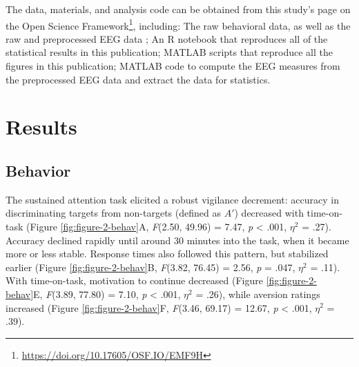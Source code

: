 \documentclass[11pt,english,]{memoir}
\let\rmarkdownfootnote\footnote%
\def\footnote{\protect\rmarkdownfootnote}
\renewcommand{\href}[2]{#2\footnote{\url{#1}}} %
\begin{document}
The data, materials, and analysis code can be obtained from this study's page on the \href{https://doi.org/10.17605/OSF.IO/EMF9H}{Open Science Framework}, including: The raw behavioral data, as well as the raw and preprocessed EEG data \autocite{Reteig2018a}; An R notebook \autocite{R-knitr} that reproduces all of the statistical results in this publication; MATLAB scripts that reproduce all the figures in this publication; MATLAB code to compute the EEG measures from the preprocessed EEG data and extract the data for statistics.

\hypertarget{MFBrain-results}{%
\section{Results}\label{MFBrain-results}}

\hypertarget{behavior}{%
\subsection{Behavior}\label{behavior}}

The sustained attention task elicited a robust vigilance decrement: accuracy in discriminating targets from non-targets (defined as \(A'\)) decreased with time-on-task (Figure \ref{fig:figure-2-behav}A, \emph{F}(2.50, 49.96) = 7.47, \emph{p} \textless{} .001, \(\eta^2\) = .27). Accuracy declined rapidly until around 30 minutes into the task, when it became more or less stable. Response times also followed this pattern, but stabilized earlier (Figure \ref{fig:figure-2-behav}B, \emph{F}(3.82, 76.45) = 2.56, \emph{p} = .047, \(\eta^2\) = .11). With time-on-task, motivation to continue decreased (Figure \ref{fig:figure-2-behav}E, \emph{F}(3.89, 77.80) = 7.10, \emph{p} \textless{} .001, \(\eta^2\) = .26), while aversion ratings increased (Figure \ref{fig:figure-2-behav}F, \emph{F}(3.46, 69.17) = 12.67, \emph{p} \textless{} .001, \(\eta^2\) = .39).
\end{document}
